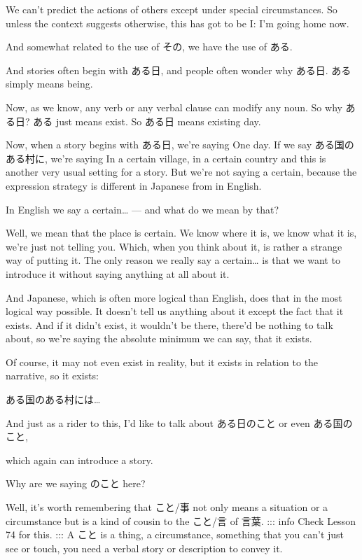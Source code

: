 We can't predict the actions of others except under special circumstances. So unless the context suggests otherwise, this has got to be I: I'm going home now.

And somewhat related to the use of その, we have the use of ある.

And stories often begin with ある日, and people often wonder why ある日. ある simply means being.

Now, as we know, any verb or any verbal clause can modify any noun. So why ある日? ある just means exist. So ある日 means existing day.

Now, when a story begins with ある日, we're saying One day. If we say ある国のある村に, we're saying In a certain village, in a certain country and this is another very usual setting for a story. But we're not saying a certain, because the expression strategy is different in Japanese from in English.

\thinrule

In English we say a certain\ldots{} --- and what do we mean by that?

Well, we mean that the place is certain. We know where it is, we know what it is, we're just not telling you. Which, when you think about it, is rather a strange way of putting it. The only reason we really say a certain\ldots{} is that we want to introduce it without saying anything at all about it.

{}

And Japanese, which is often more logical than English, does that in the most logical way possible. It doesn't tell us anything about it except the fact that it exists. And if it didn't exist, it wouldn't be there, there'd be nothing to talk about, so we're saying the absolute minimum we can say, that it exists.

Of course, it may not even exist in reality, but it exists in relation to the narrative, so it exists:

ある国のある村には\ldots{}

And just as a rider to this, I'd like to talk about ある日のこと or even ある国のこと,

which again can introduce a story.

\stopsectionlevel

\startsectionlevel[title={のこと},reference={のこと}]

Why are we saying のこと here?

Well, it's worth remembering that こと/事 not only means a situation or a circumstance but is a kind of cousin to the こと/言 of 言葉. ::: info Check Lesson 74 for this. ::: A こと is a thing, a circumstance, something that you can't just see or touch, you need a verbal story or description to convey it.

